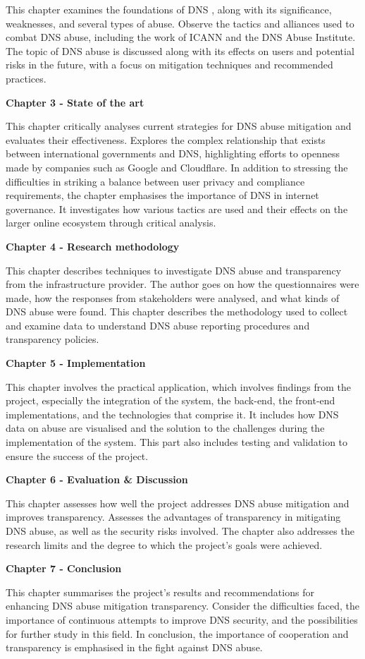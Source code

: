 This chapter examines the foundations of DNS , along with its significance, weaknesses, and several types of abuse. Observe the tactics and alliances used to combat DNS abuse, including the work of ICANN and the DNS Abuse Institute. The topic of DNS abuse is discussed along with its effects on users and potential risks in the future, with a focus on mitigation techniques and recommended practices.

\textbf{Chapter 3 -  State of the art }

This chapter critically analyses current strategies for DNS abuse mitigation and evaluates their effectiveness. Explores the complex relationship that exists between international governments and DNS, highlighting efforts to openness made by companies such as Google and Cloudflare. In addition to stressing the difficulties in striking a balance between user privacy and compliance requirements, the chapter emphasises the importance of DNS in internet governance. It investigates how various tactics are used and their effects on the larger online ecosystem through critical analysis.

\textbf{Chapter 4 -  Research methodology }

This chapter describes techniques to investigate DNS abuse and transparency from the infrastructure provider. The author goes on how the questionnaires were made, how the responses from stakeholders were analysed, and what kinds of DNS abuse were found. This chapter describes the methodology used to collect and examine data to understand DNS abuse reporting procedures and transparency policies.

\textbf{Chapter 5 -  Implementation }

This chapter involves the practical application, which involves findings from the project, especially the integration of the system, the back-end, the front-end implementations, and the technologies that comprise it. It includes how DNS data on abuse are visualised and the solution to the challenges during the implementation of the system. This part also includes testing and validation to ensure the success of the project.

\textbf{Chapter 6 -  Evaluation \& Discussion }

This chapter assesses how well the project addresses DNS abuse mitigation and improves transparency. Assesses the advantages of transparency in mitigating DNS abuse, as well as the security risks involved. The chapter also addresses the research limits and the degree to which the project's goals were achieved.

\textbf{Chapter 7 -  Conclusion }

This chapter summarises the project's results and recommendations for enhancing DNS abuse mitigation transparency. Consider the difficulties faced, the importance of continuous attempts to improve DNS security, and the possibilities for further study in this field. In conclusion, the importance of cooperation and transparency is emphasised in the fight against DNS abuse. 

